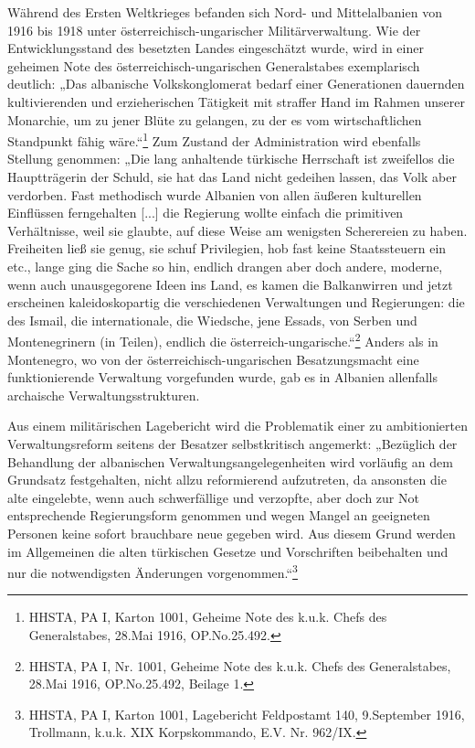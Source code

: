 Während des Ersten Weltkrieges befanden sich Nord- und Mittelalbanien von 1916 bis 1918 unter österreichisch-ungarischer Militärverwaltung. Wie der Entwicklungsstand des besetzten Landes eingeschätzt wurde, wird in einer geheimen Note des österreichisch-ungarischen Generalstabes exemplarisch deutlich: „Das albanische Volkskonglomerat bedarf einer Generationen dauernden kultivierenden und erzieherischen Tätigkeit mit straffer Hand im Rahmen unserer Monarchie, um zu jener Blüte zu gelangen, zu der es vom wirtschaftlichen Standpunkt fähig wäre.“\footnote{HHSTA, PA I, Karton 1001, Geheime Note des k.u.k. Chefs des Generalstabes, 28.Mai 1916, OP.No.25.492.} Zum Zustand der Administration wird ebenfalls Stellung genommen: „Die lang anhaltende türkische Herrschaft ist zweifellos die Hauptträgerin der Schuld, sie hat das Land nicht gedeihen lassen, das Volk aber verdorben. Fast methodisch wurde Albanien von allen äußeren kulturellen Einflüssen ferngehalten [...] die Regierung wollte einfach die primitiven Verhältnisse, weil sie glaubte, auf diese Weise am wenigsten Scherereien zu haben. Freiheiten ließ sie genug, sie schuf Privilegien, hob fast keine Staatssteuern ein etc., lange ging die Sache so hin, endlich drangen aber doch andere, moderne, wenn auch unausgegorene Ideen ins Land, es kamen die Balkanwirren und jetzt erscheinen kaleidoskopartig die verschiedenen Verwaltungen und Regierungen: die des Ismail, die internationale, die Wiedsche, jene Essads, von Serben und Montenegrinern (in Teilen), endlich die österreich-ungarische.“\footnote{HHSTA, PA I, Nr. 1001, Geheime Note des k.u.k. Chefs des Generalstabes, 28.Mai 1916, OP.No.25.492, Beilage 1.} Anders als in Montenegro, wo von der österreichisch-ungarischen Besatzungsmacht eine funktionierende Verwaltung vorgefunden wurde, gab es in Albanien allenfalls archaische Verwaltungsstrukturen.\par
Aus einem militärischen Lagebericht wird die Problematik einer zu ambitionierten Verwaltungsreform seitens der Besatzer selbstkritisch angemerkt: „Bezüglich der Behandlung der albanischen Verwaltungsangelegenheiten wird vorläufig an dem Grundsatz festgehalten, nicht allzu reformierend aufzutreten, da ansonsten die alte eingelebte, wenn auch schwerfällige und verzopfte, aber doch zur Not entsprechende Regierungsform genommen und wegen Mangel an geeigneten Personen keine sofort brauchbare neue gegeben wird. Aus diesem Grund werden im Allgemeinen die alten türkischen Gesetze und Vorschriften beibehalten und nur die notwendigsten Änderungen vorgenommen.“\footnote{HHSTA, PA I, Karton 1001, Lagebericht Feldpostamt 140, 9.September 1916, Trollmann, k.u.k. XIX Korpskommando, E.V. Nr. 962/IX.}\par
